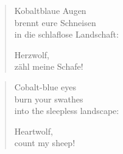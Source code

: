 
\cleartoverso


\begin{verse}
Kobaltblaue Augen\\
brennt eure Schneisen\\
in die schlaflose Landschaft:

Herzwolf,\\
zähl meine Schafe!
\end{verse}

\cleartorecto


\begin{verse}
Cobalt-blue eyes\\
burn your swathes\\
into the sleepless landscape:

Heartwolf,\\
count my sheep!
\end{verse}

